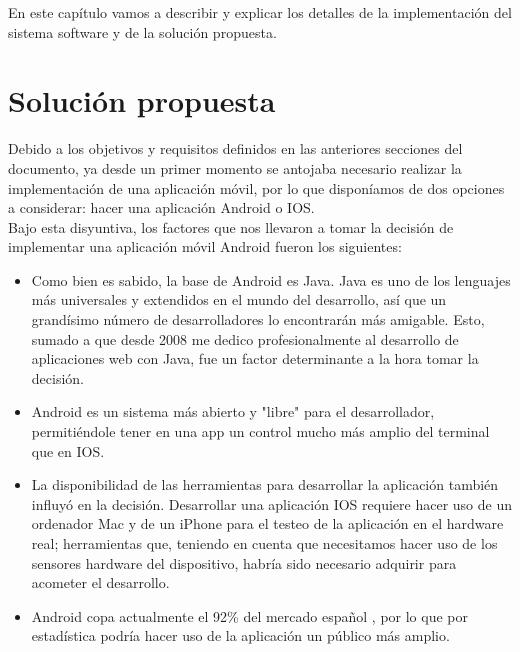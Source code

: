 

En este capítulo vamos a describir y explicar los detalles de la implementación del sistema software y de la solución propuesta.

\section{Solución propuesta}

Debido a los objetivos y requisitos definidos en las anteriores secciones del documento, ya desde un primer momento se antojaba necesario realizar la implementación de una aplicación móvil, por lo que disponíamos de dos opciones a considerar: hacer una aplicación Android o IOS.\\

Bajo esta disyuntiva, los factores que nos llevaron a tomar la decisión de implementar una aplicación móvil Android fueron los siguientes:

\begin{itemize}
\item Como bien es sabido, la base de Android es Java. Java es uno de los lenguajes más universales y extendidos en el mundo del desarrollo, así que un grandísimo número de desarrolladores lo encontrarán más amigable. Esto, sumado a que desde 2008 me dedico profesionalmente al desarrollo de aplicaciones web con Java, fue un factor determinante a la hora tomar la decisión.
\item Android es un sistema más abierto y "libre" para el desarrollador, permitiéndole tener en una app un control mucho más amplio del terminal que en IOS.
\item La disponibilidad de las herramientas para desarrollar la aplicación también influyó en la decisión. Desarrollar una aplicación IOS requiere hacer uso de un ordenador Mac y de un iPhone para el testeo de la aplicación en el hardware real; herramientas que, teniendo en cuenta que necesitamos hacer uso de los sensores hardware del dispositivo, habría sido necesario adquirir para acometer el desarrollo.
\item Android copa actualmente el 92\% del mercado español \cite{website:cuota}, por lo que por estadística podría hacer uso de la aplicación un público más amplio.
\end{itemize}

